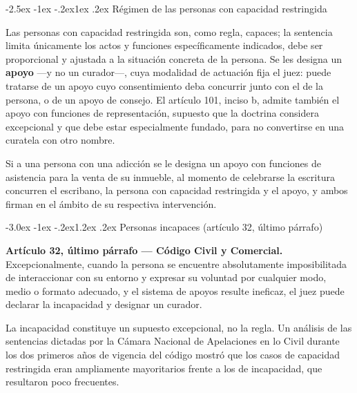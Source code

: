 \documentclass[12pt,oneside]{book}
\makeatletter
\renewcommand\section{\@startsection{section}{1}{\z@}%
  {-3.0ex \@plus -1ex \@minus -.2ex}{1.2ex \@plus .2ex}%
  {\normalfont\large\bfseries\color{acento}}}
\renewcommand\subsection{\@startsection{subsection}{2}{\z@}%
  {-2.5ex \@plus -1ex \@minus -.2ex}{1ex \@plus .2ex}%
  {\normalfont\normalsize\bfseries}}
\makeatother
\begin{document}
\subsection{Régimen de las personas con capacidad restringida}

Las personas con capacidad restringida son, como regla, capaces; la sentencia limita únicamente los actos y funciones específicamente indicados, debe ser proporcional y ajustada a la situación concreta de la persona. Se les designa un \textbf{apoyo} ---y no un curador---, cuya modalidad de actuación fija el juez: puede tratarse de un apoyo cuyo consentimiento deba concurrir junto con el de la persona, o de un apoyo de consejo. El artículo 101, inciso b, admite también el apoyo con funciones de representación, supuesto que la doctrina considera excepcional y que debe estar especialmente fundado, para no convertirse en una curatela con otro nombre.

\begin{ejemplo}
Si a una persona con una adicción se le designa un apoyo con funciones de asistencia para la venta de su inmueble, al momento de celebrarse la escritura concurren el escribano, la persona con capacidad restringida y el apoyo, y ambos firman en el ámbito de su respectiva intervención.
\end{ejemplo}

\section{Personas incapaces (artículo 32, último párrafo)}

\begin{importante}
\textbf{Artículo 32, último párrafo --- Código Civil y Comercial.} Excepcionalmente, cuando la persona se encuentre absolutamente imposibilitada de interaccionar con su entorno y expresar su voluntad por cualquier modo, medio o formato adecuado, y el sistema de apoyos resulte ineficaz, el juez puede declarar la incapacidad y designar un curador.
\end{importante}

La incapacidad constituye un supuesto excepcional, no la regla. Un análisis de las sentencias dictadas por la Cámara Nacional de Apelaciones en lo Civil durante los dos primeros años de vigencia del código mostró que los casos de capacidad restringida eran ampliamente mayoritarios frente a los de incapacidad, que resultaron poco frecuentes.
\end{document}

